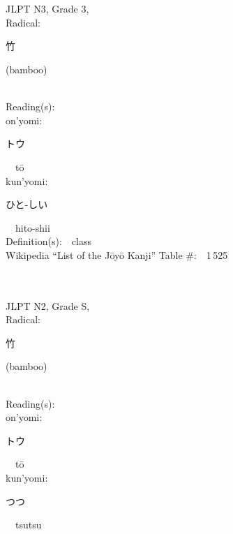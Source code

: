 \begin{multicols}{2}
\ \ \\
{\fontsize{34pt}{40pt}  }\ \ \\  %
{JLPT N3, Grade 3, \\Radical:\ \ {\begin{CJK}{UTF8}{min} 竹 \end{CJK}} (bamboo) } \\
Reading(s):\ \ \\
{\hspace*{1em}}on'yomi:\ \ \\
{\hspace*{2em}}{\begin{CJK}{UTF8}{min} トウ \end{CJK}}\ \ t\=o\ \ \\
{\hspace*{1em}}kun'yomi:\ \ \\
{\hspace*{2em}}{\begin{CJK}{UTF8}{min} ひと-しい \end{CJK}}\ \ hito-shii\ \ \\
Definition(s):\ \ class \\
Wikipedia ``List of the J\=oy\=o Kanji'' Table \#:\ \ 1\,525 \\
\ \ \\
{\fontsize{34pt}{40pt}  }\ \ \\  %
{JLPT N2, Grade S, \\Radical:\ \ {\begin{CJK}{UTF8}{min} 竹 \end{CJK}} (bamboo) } \\
Reading(s):\ \ \\
{\hspace*{1em}}on'yomi:\ \ \\
{\hspace*{2em}}{\begin{CJK}{UTF8}{min} トウ \end{CJK}}\ \ t\=o\ \ \\
{\hspace*{1em}}kun'yomi:\ \ \\
{\hspace*{2em}}{\begin{CJK}{UTF8}{min} つつ \end{CJK}}\ \ tsutsu\ \ \\

\end{multicols}
